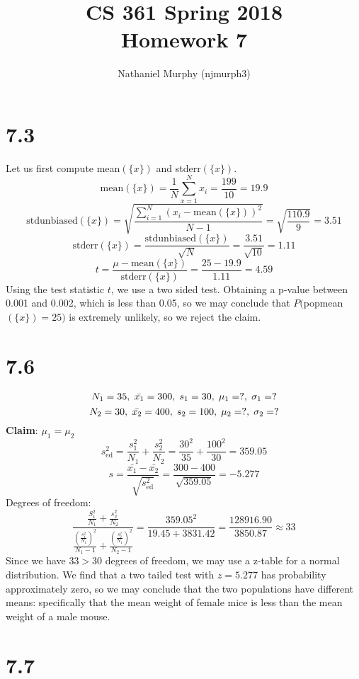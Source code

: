 \documentclass[11pt]{article}
\title{\textbf{CS 361 Spring 2018\\Homework 7}}
\author{Nathaniel Murphy (njmurph3)}
\date{}
\begin{document}
\maketitle
\section*{7.3}
Let us first compute mean$(\{x\})$ and stderr$(\{x\})$.
\[\text{mean}(\{x\})=\frac{1}{N}\sum_{x=1}^Nx_i=\frac{199}{10}=19.9\]
\[\text{stdunbiased}(\{x\})=\sqrt{\frac{\sum_{i=1}^N(x_i-\text{mean}(\{x\}))^2}{N-1}}=\sqrt{\frac{110.9}{9}}=3.51\]
\[\text{stderr}(\{x\})=\frac{\text{stdunbiased}(\{x\})}{\sqrt{N}}=\frac{3.51}{\sqrt{10}}=1.11\]
\[t=\frac{\mu-\text{mean}(\{x\})}{\text{stderr}(\{x\})}=\frac{25-19.9}{1.11}=4.59\]
Using the test statistic $t$, we use a two sided test. Obtaining a p-value between 0.001 and 0.002, which is less than 0.05, so we may conclude that $P($popmean$(\{x\})=25)$ is extremely unlikely, so we reject the claim.
\section*{7.6}
\[N_1=35,\hspace{1mm}\bar{x_1}=300,\hspace{1mm}s_1=30,\hspace{1mm}\mu_1=?,\hspace{1mm}\sigma_1=?\]
\[N_2=30,\hspace{1mm}\bar{x_2}=400,\hspace{1mm}s_2=100,\hspace{1mm}\mu_2=?,\hspace{1mm}\sigma_2=?\]
\textbf{Claim}: $\mu_1=\mu_2$
\[s^2_{\text{ed}}=\frac{s_1^2}{N_1}+\frac{s_2^2}{N_2}=\frac{30^2}{35}+\frac{100^2}{30}=359.05\]
\[s=\frac{\bar{x_1}-\bar{x_2}}{\sqrt{s^2_{\text{ed}}}}=\frac{300-400}{\sqrt{359.05}}=-5.277\]
Degrees of freedom:
\[\frac{\frac{S_1^2}{N_1}+\frac{s_2^2}{N_2}}{\frac{\left(\frac{s_1^2}{N_1}\right)^2}{N_1-1}+\frac{\left(\frac{s_2^2}{N_1}\right)^2}{N_2-1}}=\frac{359.05^2}{19.45+3831.42}=\frac{128916.90}{3850.87}\approx33\]
Since we have $33>30$ degrees of freedom, we may use a z-table for a normal distribution. We find that a two tailed test with $z=5.277$ has probability approximately zero, so we may conclude that the two populations have different means: specifically that the mean weight of female mice is less than the mean weight of a male mouse.
\section*{7.7}
\end{document}
